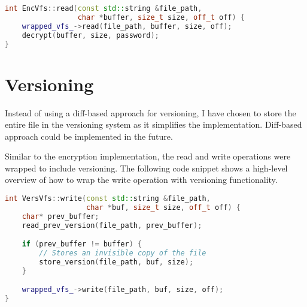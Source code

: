 \begin{lstlisting}[language=c++, basicstyle=\ttfamily\small, caption={Wrapping the read operation with encryption.}, label={lst:read}]
int EncVfs::read(const std::string &file_path,
                 char *buffer, size_t size, off_t off) {
    wrapped_vfs_->read(file_path, buffer, size, off);
    decrypt(buffer, size, password);
}
\end{lstlisting}



\section{Versioning}\label{sec:versioning2}

Instead of using a diff-based approach for versioning, I have chosen to store the entire file in the versioning system as it simplifies the implementation.
Diff-based approach could be implemented in the future.

Similar to the encryption implementation, the read and write operations were wrapped to include versioning.
The following code snippet shows a high-level overview of how to wrap the write operation with versioning functionality.

\begin{lstlisting}[language=c++, basicstyle=\ttfamily\small]
int VersVfs::write(const std::string &file_path,
                   char *buf, size_t size, off_t off) {
    char* prev_buffer;
    read_prev_version(file_path, prev_buffer);

    if (prev_buffer != buffer) {
        // Stores an invisible copy of the file
        store_version(file_path, buf, size);
    }

    wrapped_vfs_->write(file_path, buf, size, off);
}
\end{lstlisting}